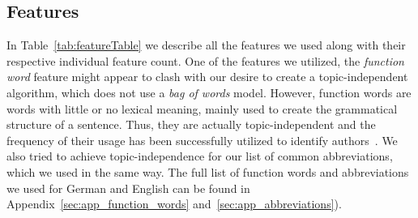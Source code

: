 \subsection{Features}
\label{sec:impl_features}

\begin{savenotes}


In Table~\ref{tab:featureTable} we describe all the features we used along with their respective individual feature count.
One of the features we utilized, the \textit{function word} feature might appear to clash with our desire to create a topic-independent algorithm, which does not use a \textit{bag of words} model.
However, function words are words with little or no lexical meaning, mainly used to create the grammatical structure of a sentence.
Thus, they are actually topic-independent and the frequency of their usage has been successfully utilized to identify authors~\cite{mosteller1962applied}.
We also tried to achieve topic-independence for our list of common abbreviations, which we used in the same way.
The full list of function words and abbreviations we used for German and English can be found in Appendix~\ref{sec:app_function_words} and~\ref{sec:app_abbreviations}).



\end{savenotes}

